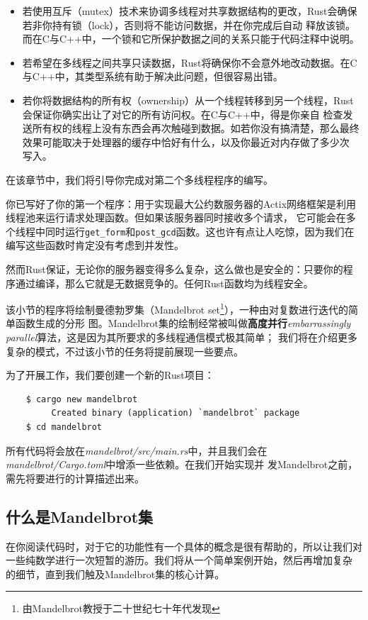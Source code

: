 \smallskip
\begin{itemize}
    \item 若使用互斥（mutex）技术来协调多线程对共享数据结构的更改，Rust会确保若非你持有锁（lock），否则将不能访问数据，并在你完成后自动
释放该锁。而在C与C++中，一个锁和它所保护数据之间的关系只能于代码注释中说明。
    \item 若希望在多线程之间共享只读数据，Rust将确保你不会意外地改动数据。在C与C++中，其类型系统有助于解决此问题，但很容易出错。
    \item 若你将数据结构的所有权（ownership）从一个线程转移到另一个线程，Rust会保证你确实出让了对它的所有访问权。在C与C++中，得是你亲自
检查发送所有权的线程上没有东西会再次触碰到数据。如若你没有搞清楚，那么最终效果可能取决于处理器的缓存中恰好有什么，以及你最近对内存做了多少次
写入。
\end{itemize}

\smallskip
在该章节中，我们将引导你完成对第二个多线程程序的编写。

\medskip
你已写好了你的第一个程序：用于实现最大公约数服务器的Actix网络框架是利用线程池来运行请求处理函数。但如果该服务器同时接收多个请求，
它可能会在多个线程中同时运行\texttt{get\_form}和\texttt{post\_gcd}函数。这也许有点让人吃惊，因为我们在编写这些函数时肯定没有考虑到并发性。

\medskip
然而Rust保证，无论你的服务器变得多么复杂，这么做也是安全的：只要你的程序通过编译，那么它就是无数据竞争的。任何Rust函数均为线程安全。

\medskip
该小节的程序将绘制曼德勃罗集（Mandelbrot set\footnote{由Mandelbrot教授于二十世纪七十年代发现}），一种由对复数进行迭代的简单函数生成的分形
图。Mandelbrot集的绘制经常被叫做\textbf{高度并行}\textit{embarrassingly parallel}算法，这是因为其所要求的多线程通信模式极其简单；
我们将在介绍更多复杂的模式，不过该小节的任务将提前展现一些要点。

\medskip
为了开展工作，我们要创建一个新的Rust项目：
\begin{verbatim}
    $ cargo new mandelbrot
         Created binary (application) `mandelbrot` package
    $ cd mandelbrot
\end{verbatim}

\smallskip
所有代码将会放在\textit{mandelbrot/src/main.rs}中，并且我们会在\textit{mandelbrot/Cargo.toml}中增添一些依赖。在我们开始实现并
发Mandelbrot之前，需先将要进行的计算描述出来。

\medskip
\subsection{什么是Mandelbrot集}
在你阅读代码时，对于它的功能性有一个具体的概念是很有帮助的，所以让我们对一些纯数学进行一次短暂的游历。我们将从一个简单案例开始，然后再增加复杂
的细节，直到我们触及Mandelbrot集的核心计算。

